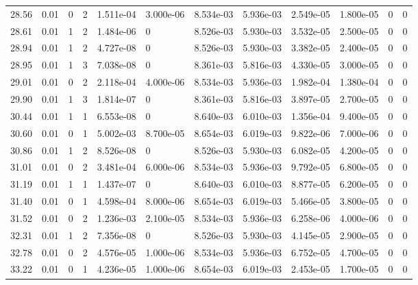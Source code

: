 \documentclass[preview]{standalone}
\begin{document}
{{{\begin{tabular}{L{1.2cm}C{1.2cm} C{0.3cm}C{0.5cm} C{1.4cm}C{1.4cm} C{1.4cm}C{1.4cm} C{1.6cm}C{1.6cm} C{1.6cm}C{1.6cm}}
  28.56  &  0.01  & 0     &  2 &  1.511e-04  & 3.000e-06  &  8.534e-03&   5.936e-03& 2.549e-05 & 1.800e-05   &  0 & 0  \\ 
  28.61  &  0.01  & 1     &  2 &  1.484e-06  & 0  &  8.526e-03&   5.930e-03& 3.532e-05 & 2.500e-05   &  0 & 0  \\ 
  28.94  &  0.01  & 1     &  2 &  4.727e-08  & 0  &  8.526e-03&   5.930e-03& 3.382e-05 & 2.400e-05   &  0 & 0  \\ 
  28.95  &  0.01  & 1     &  3 &  7.038e-08  & 0  &  8.361e-03&   5.816e-03& 4.330e-05 & 3.000e-05   &  0 & 0  \\ 
  29.01  &  0.01  & 0     &  2 &  2.118e-04  & 4.000e-06  &  8.534e-03&   5.936e-03& 1.982e-04 & 1.380e-04   &  0 & 0  \\ 
  29.90  &  0.01  & 1     &  3 &  1.814e-07  & 0  &  8.361e-03&   5.816e-03& 3.897e-05 & 2.700e-05   &  0 & 0  \\ 
  30.44  &  0.01  & 1     &  1 &  6.553e-08  & 0  &  8.640e-03&   6.010e-03& 1.356e-04 & 9.400e-05   &  0 & 0  \\ 
  30.60  &  0.01  & 0     &  1 &  5.002e-03  & 8.700e-05  &  8.654e-03&   6.019e-03& 9.822e-06 & 7.000e-06   &  0 & 0  \\ 
  30.86  &  0.01  & 1     &  2 &  8.526e-08  & 0  &  8.526e-03&   5.930e-03& 6.082e-05 & 4.200e-05   &  0 & 0  \\ 
  31.01  &  0.01  & 0     &  2 &  3.481e-04  & 6.000e-06  &  8.534e-03&   5.936e-03& 9.792e-05 & 6.800e-05   &  0 & 0  \\ 
  31.19  &  0.01  & 1     &  1 &  1.437e-07  & 0  &  8.640e-03&   6.010e-03& 8.877e-05 & 6.200e-05   &  0 & 0  \\ 
  31.40  &  0.01  & 0     &  1 &  4.598e-04  & 8.000e-06  &  8.654e-03&   6.019e-03& 5.466e-05 & 3.800e-05   &  0 & 0  \\ 
  31.52  &  0.01  & 0     &  2 &  1.236e-03  & 2.100e-05  &  8.534e-03&   5.936e-03& 6.258e-06 & 4.000e-06   &  0 & 0  \\ 
  32.31  &  0.01  & 1     &  2 &  7.356e-08  & 0  &  8.526e-03&   5.930e-03& 4.145e-05 & 2.900e-05   &  0 & 0  \\ 
  32.78  &  0.01  & 0     &  2 &  4.576e-05  & 1.000e-06  &  8.534e-03&   5.936e-03& 6.752e-05 & 4.700e-05   &  0 & 0  \\ 
  33.22  &  0.01  & 0     &  1 &  4.236e-05  & 1.000e-06  &  8.654e-03&   6.019e-03& 2.453e-05 & 1.700e-05   &  0 & 0  \\ 
\hline 
\end{tabular} 

}}}
\end{document}
